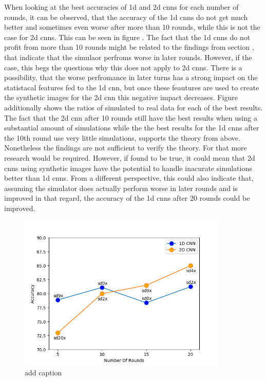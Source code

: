 When looking at the best accuracies of 1d and 2d cnns for each number of rounds, it can be observed, that the accuracy of the 1d cnns do not get much better and sometimes even worse after more than 10 rounds, while this is not the case for 2d cnns. This can be seen in figure . The fact that the 1d cnns do not profit from more than 10 rounds might be related to the findings from section , that indicate that the simulaor perfroms worse in later rounds. However, if the case, this begs the questions why this does not apply to 2d cnns. There is a possibility, that the worse perfromance in later turns has a strong impact on the statistacal features fed to the 1d cnn, but once these feautures are used to create the synthetic images for the 2d cnn this negative impact decreases. Figure  additionally shows the ratios of simulated to real data for each of the best results. The fact that the 2d cnn after 10 rounds still have the best results when using a substantial amount of simulations while the the best results for the 1d cnns after the 10th round use very little simulations, supports the theory from above. Nonetheless the findings are not sufficient to verify the theory. For that more research would be required. However, if found to be true, it could mean that 2d cnns using synthetic images have the potential to handle inacurate simulations better than 1d cnns. From a different perspective, this could also indicate that, assuming the simulator does actually perform worse in later rounds and is improved in that regard, the accuracy of the 1d cnns after 20 rounds could be improved.

\begin{figure}[H]
	\centering
	\includegraphics[width=10cm]{images/bestAccPlot.png}
	\caption[Bild kurz]{add caption}
	\label{fig:bestAccPlot}
\end{figure}



